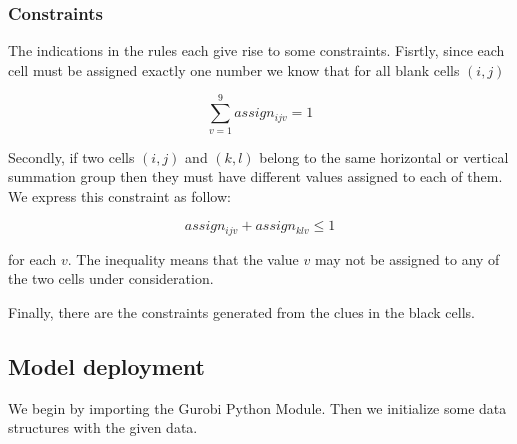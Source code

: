 \documentclass[11pt]{article}
\begin{document}
\subsubsection{Constraints}\label{constraints}

The indications in the rules each give rise to some constraints.
Fisrtly, since each cell must be assigned exactly one number we know
that for all blank cells \((i,j)\)

\[\sum_{v=1}^{9} assign_{ijv} = 1\]

Secondly, if two cells \((i,j)\) and \((k,l)\) belong to the same
horizontal or vertical summation group then they must have different
values assigned to each of them. We express this constraint as follow:

\[assign_{ijv} + assign_{klv} \leq 1\]

for each \(v\). The inequality means that the value \(v\) may not be
assigned to any of the two cells under consideration.

Finally, there are the constraints generated from the clues in the black
cells.

\subsection{Model deployment}\label{model-deployment}

We begin by importing the Gurobi Python Module. Then we initialize some
data structures with the given data.
\end{document}

